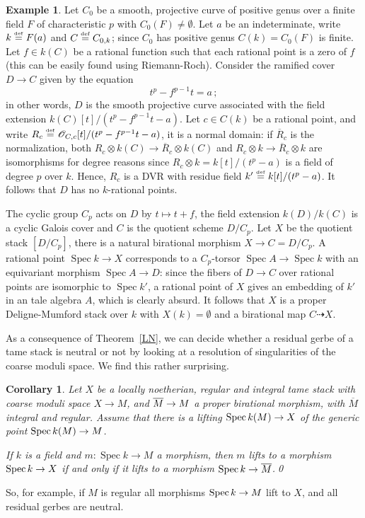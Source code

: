 \documentclass{amsart}
\numberwithin{equation}{section}
\numberwithin{subsection}{section}
\newtheorem{corollary}[theorem]{Corollary}
\theoremstyle{definition}
\newtheorem{example}[theorem]{Example}
\theoremstyle{remark}
\renewcommand{\mathcal}{\mathscr}
\newcommand\cO{\mathcal{O}} \newcommand\cP{\mathcal{P}}
\newcommand\arr{\ifinner\to\else\longrightarrow\fi}
\newcommand{\eqdef}{\mathrel{\smash{\overset{\mathrm{\scriptscriptstyle def}} =}}}
\newcommand\spec{\operatorname{Spec}}
\begin{document}
\begin{example}\label{counterLNP}
	Let $C_{0}$ be a smooth, projective curve of positive genus over a finite field $F$ of characteristic $p$ with $C_{0}(F)\neq \emptyset$. Let $a$ be an indeterminate, write $k \eqdef F(a)$ and $C \eqdef C_{0,k}$; since $C_{0}$ has positive genus $C(k) = C_{0}(F)$ is finite. Let $f\in k(C)$ be a rational function such that each rational point is a zero of $f$ (this can be easily found using Riemann-Roch). Consider the ramified cover $D\to C$ given by the equation
	\[t^{p}-f^{p-1}t=a\,;\]
in other words, $D$ is the smooth projective curve associated with the field extension $k(C)[t]/(t^{p}-f^{p-1}t-a)$. Let $c\in C(k)$ be a rational point, and write $R_{c} \eqdef \cO_{C,c}[t]/(t^{p}-f^{p-1}t-a)$, it is a normal domain: if $\overline{R}_{c}$ is the normalization, both $R_{c}\otimes k(C)\to \overline{R}_{c}\otimes k(C)$ and $R_{c}\otimes k\to \overline{R}_{c}\otimes k$ are isomorphisms for degree reasons since $R_{c}\otimes k = k[t]/(t^{p}-a)$ is a field of degree $p$ over $k$. Hence, $R_{c}$ is a DVR with residue field $k' \eqdef k[t]/(t^{p}-a)$. It follows that $D$ has no $k$-rational points.
	
	The cyclic group $C_{p}$ acts on $D$ by $t\mapsto t+f$, the field extension $k(D)/k(C)$ is a cyclic Galois cover and $C$ is the quotient scheme $D/C_{p}$. Let $X$ be the quotient stack $[D/C_{p}]$, there is a natural birational morphism $X\to C=D/C_{p}$. A rational point $\spec k\to X$ corresponds to a $C_{p}$-torsor $\spec A\to\spec k$ with an equivariant morphism $\spec A\to D$: since the fibers of $D\to C$ over rational points are isomorphic to $\spec k'$, a rational point of $X$ gives an embedding of $k'$ in an tale algebra $A$, which is clearly absurd. It follows that $X$ is a proper Deligne-Mumford stack over $k$ with $X(k)=\emptyset$ and a birational map $C\dashrightarrow X$.
\end{example}

As a consequence of Theorem~\ref{LN}, we can decide whether a residual gerbe of a tame stack is neutral or not by looking at a resolution of singularities of the coarse moduli space. We find this rather surprising.

\begin{corollary}\label{cor:moduli}
	Let $X$ be a locally noetherian, regular and integral tame stack with coarse moduli space $X\to M$, and $\overline{M} \arr M$ a proper birational morphism, with $\overline{M}$ integral and regular. Assume that there is a lifting $\spec k(M) \arr X$ of the generic point\/ $\spec k(M) \arr M$.
	
	If $k$ is a field and $m\colon \spec k\to M$ a morphism, then $m$ lifts to a morphism $\spec k \arr X$ if and only if it lifts to a morphism $\spec k \arr \overline{M}$.\qed
\end{corollary}

So, for example, if $M$ is regular all morphisms $\spec k \arr M$ lift to $X$, and all residual gerbes are neutral.



\end{document}
